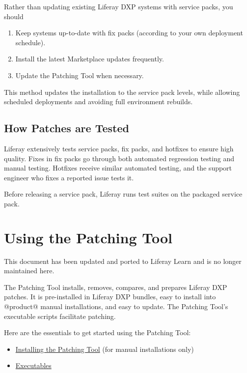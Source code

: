 Rather than updating existing Liferay DXP systems with service packs,
you should

\begin{enumerate}
\def\labelenumi{\arabic{enumi}.}
\item
  Keep systems up-to-date with fix packs (according to your own
  deployment schedule).
\item
  Install the latest Marketplace updates frequently.
\item
  Update the Patching Tool when necessary.
\end{enumerate}

This method updates the installation to the service pack levels, while
allowing scheduled deployments and avoiding full environment rebuilds.

\section{How Patches are Tested}\label{how-patches-are-tested}

Liferay extensively tests service packs, fix packs, and hotfixes to
ensure high quality. Fixes in fix packs go through both automated
regression testing and manual testing. Hotfixes receive similar
automated testing, and the support engineer who fixes a reported issue
tests it.

Before releasing a service pack, Liferay runs test suites on the
packaged service pack.

\chapter{Using the Patching Tool}\label{using-the-patching-tool}

{This document has been updated and ported to Liferay Learn and is no
longer maintained here.}

The Patching Tool installs, removes, compares, and prepares Liferay DXP
patches. It is pre-installed in Liferay DXP bundles, easy to install
into @product@ manual installations, and easy to update. The Patching
Tool's executable scripts facilitate patching.

Here are the essentials to get started using the Patching Tool:

\begin{itemize}
\tightlist
\item
  \hyperref[installing-the-patching-tool]{Installing the Patching Tool}
  (for manual installations only)
\item
  \hyperref[executables]{Executables}
\end{itemize}

